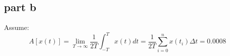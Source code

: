 \subsection{part b}
Assume:
$$
A[x(t)] = \lim_{T\to\infty}\dfrac{1}{2T}\int_{-T}^T x(t)dt = \dfrac{1}{2T}\sum_{i = 0}^nx(t_i)\Delta t = 0.0008
$$